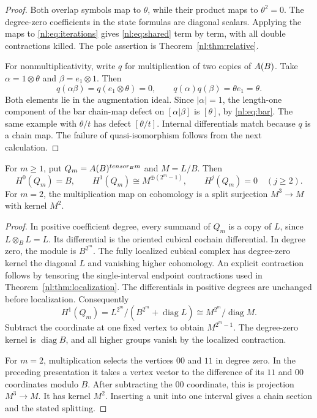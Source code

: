 \begin{proof}
Both overlap symbols map to \(\theta\), while their product maps to
\(\theta^2=0\). The degree-zero coefficients in the state formulas
are diagonal scalars. Applying the maps to \eqref{nl:eq:iterations} gives
\eqref{nl:eq:shared} term by term, with all double contractions killed.
The pole assertion is Theorem~\ref{nl:thm:relative}.

For nonmultiplicativity, write \(q\) for multiplication of two copies
of \(A(B)\). Take \(\alpha=1\otimes\theta\) and
\(\beta=e_1\otimes1\). Then
\[
 q(\alpha\beta)=q(e_1\otimes\theta)=0,\qquad
 q(\alpha)q(\beta)=\theta e_1=\theta.
\]
Both elements lie in the augmentation ideal. Since \(|\alpha|=1\),
the length-one component of the bar chain-map defect on
\([\alpha|\beta]\) is \([\theta]\), by \eqref{nl:eq:bar}.
The same example with \(\theta/t\) has defect \([\theta/t]\).
Internal differentials match because \(q\) is a chain map.
The failure of quasi-isomorphism follows from the next calculation.
\end{proof}

\begin{lemma}\label{nl:lem:cube}
For \(m\geq1\), put \(Q_m=A(B)^{tensor_B m}\) and \(M=L/B\).
Then
\[
 H^0(Q_m)=B,\qquad H^1(Q_m)\cong M^{\oplus(2^m-1)},\qquad
 H^j(Q_m)=0\quad(j\geq2).
\]
For \(m=2\), the multiplication map on cohomology is a split
surjection \(M^3\to M\) with kernel \(M^2\).
\end{lemma}

\begin{proof}
In positive coefficient degree, every summand of \(Q_m\) is a copy
of \(L\), since \(L\otimes_B L=L\). Its differential is the
oriented cubical cochain differential. In degree zero, the module is
\(B^{2^m}\). The fully localized cubical complex has degree-zero
kernel the diagonal \(L\) and vanishing higher cohomology.
An explicit contraction follows by tensoring the single-interval
endpoint contractions used in Theorem~\ref{nl:thm:localization}.
The differentials in positive degrees are unchanged before localization.
Consequently
\[
 H^1(Q_m)=L^{2^m}/(B^{2^m}+\operatorname{diag}L)
              \cong M^{2^m}/\operatorname{diag}M.
\]
Subtract the coordinate at one fixed vertex to obtain \(M^{2^m-1}\).
The degree-zero kernel is \(\operatorname{diag}B\), and all higher
groups vanish by the localized contraction.

For \(m=2\), multiplication selects the vertices \(00\) and \(11\)
in degree zero. In the preceding presentation it takes a vertex vector
to the difference of its \(11\) and \(00\) coordinates modulo \(B\).
After subtracting the \(00\) coordinate, this is projection \(M^3\to M\).
It has kernel \(M^2\). Inserting a unit into one interval gives a
chain section and the stated splitting.
\end{proof}


